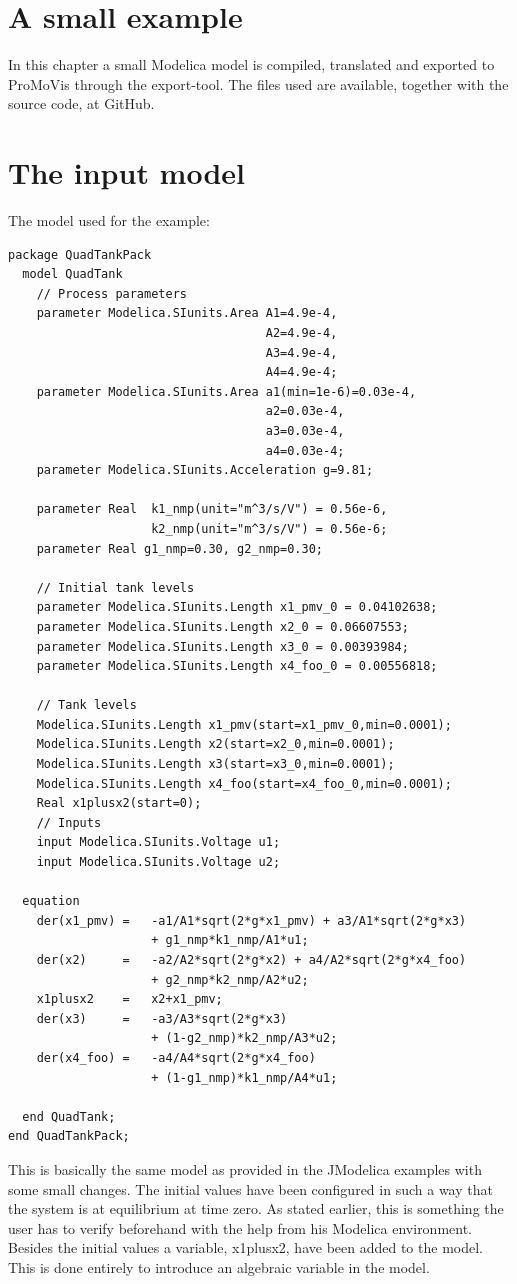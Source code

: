 \section{A small example}
In this chapter a small Modelica model is compiled, translated and exported to ProMoVis through the export-tool. The files used are available, together with the source code, at GitHub\cite{githabb}\nocite{*}.

\section{The input model}

The model used for the example:
\lstset{language=modelica}
\begin{lstlisting}
package QuadTankPack
  model QuadTank
    // Process parameters
	parameter Modelica.SIunits.Area A1=4.9e-4, 
									A2=4.9e-4, 
									A3=4.9e-4, 
									A4=4.9e-4;
	parameter Modelica.SIunits.Area a1(min=1e-6)=0.03e-4, 
									a2=0.03e-4, 
									a3=0.03e-4, 
									a4=0.03e-4;
	parameter Modelica.SIunits.Acceleration g=9.81;
	
	parameter Real 	k1_nmp(unit="m^3/s/V") = 0.56e-6, 
					k2_nmp(unit="m^3/s/V") = 0.56e-6;
	parameter Real g1_nmp=0.30, g2_nmp=0.30;

    // Initial tank levels
	parameter Modelica.SIunits.Length x1_pmv_0 = 0.04102638;
	parameter Modelica.SIunits.Length x2_0 = 0.06607553;
	parameter Modelica.SIunits.Length x3_0 = 0.00393984;
	parameter Modelica.SIunits.Length x4_foo_0 = 0.00556818;
	
    // Tank levels
	Modelica.SIunits.Length x1_pmv(start=x1_pmv_0,min=0.0001);
	Modelica.SIunits.Length x2(start=x2_0,min=0.0001);
	Modelica.SIunits.Length x3(start=x3_0,min=0.0001);
	Modelica.SIunits.Length x4_foo(start=x4_foo_0,min=0.0001);
	Real x1plusx2(start=0);
	// Inputs
	input Modelica.SIunits.Voltage u1;
	input Modelica.SIunits.Voltage u2;

  equation    
    der(x1_pmv) = 	-a1/A1*sqrt(2*g*x1_pmv) + a3/A1*sqrt(2*g*x3) 
					+ g1_nmp*k1_nmp/A1*u1;						
	der(x2) 	= 	-a2/A2*sqrt(2*g*x2) + a4/A2*sqrt(2*g*x4_foo)
					+ g2_nmp*k2_nmp/A2*u2;
	x1plusx2	=	x2+x1_pmv;
	der(x3) 	= 	-a3/A3*sqrt(2*g*x3) 
					+ (1-g2_nmp)*k2_nmp/A3*u2;
	der(x4_foo) = 	-a4/A4*sqrt(2*g*x4_foo) 
					+ (1-g1_nmp)*k1_nmp/A4*u1;

  end QuadTank;
end QuadTankPack;
\end{lstlisting}
This is basically the same model as provided in the JModelica examples with some small changes. The initial values have been configured in such a way that the system is at equilibrium at time zero. As stated earlier, this is something the user has to verify beforehand with the help from his Modelica environment. Besides the initial values a variable, x1plusx2, have been added to the model. This is done entirely to introduce an algebraic variable in the model.
